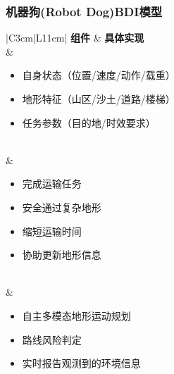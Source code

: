 \documentclass[12pt,a4paper]{article}
\begin{document}
\subsubsection{机器狗(Robot Dog)BDI模型}
\begin{table}[h]
	\centering
	\caption{机器狗BDI模型}
	\label{tab:robot-dog-bdi}
	\begin{tabular}{|C{3cm}|L{11cm}|}
		\hline
		\textbf{组件} & \textbf{具体实现} \\
		\hline
		 & 
		\begin{minipage}[t]{\linewidth}
			\begin{itemize}[leftmargin=*, nosep, topsep=0pt, itemsep=3pt]
				\item 自身状态（位置/速度/动作/载重）
				\item 地形特征（山区/沙土/道路/楼梯）
				\item 任务参数（目的地/时效要求）
			\end{itemize}
		\end{minipage} \\
		\hline
		 & 
		\begin{minipage}[t]{\linewidth}
			\begin{itemize}[leftmargin=*, nosep, topsep=0pt, itemsep=3pt]
				\item 完成运输任务
				\item 安全通过复杂地形
				\item 缩短运输时间
				\item 协助更新地形信息
			\end{itemize}
		\end{minipage} \\
		\hline
		 & 
		\begin{minipage}[t]{\linewidth}
			\begin{itemize}[leftmargin=*, nosep, topsep=0pt, itemsep=3pt]
				\item 自主多模态地形运动规划
				\item 路线风险判定
				\item 实时报告观测到的环境信息
			\end{itemize}
		\end{minipage} \\
		\hline
	\end{tabular}
\end{table}
\FloatBarrier
\end{document}
